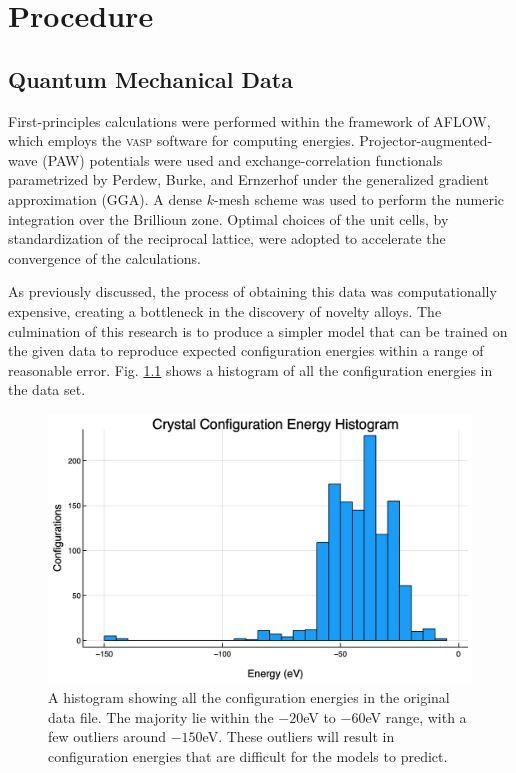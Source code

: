\chapter{Procedure} \label{Sect:procedure}
\section{Quantum Mechanical Data}\label{Sect:procedureData}
\par First-principles calculations were performed within the framework of AFLOW,\cite{monster,curtarolo:art13,curtarolo:art49,curtarolo:art53,curtarolo:art51,curtarolo:art56,curtarolo:art58,curtarolo:art64} which employs the \textsc{vasp} software for computing energies.\cite{kresse1993abinitio} Projector-augmented-wave (PAW) potentials were used and exchange-correlation functionals parametrized by Perdew, Burke, and Ernzerhof under the generalized gradient approximation (GGA)\cite{Kresse:1999wc,kresse1996efficiency,Blochl:1994dx}. A dense $k$-mesh scheme was used to perform the numeric integration over the Brillioun zone\cite{monkhorst1976special}. Optimal choices of the unit cells, by standardization of the reciprocal lattice, were adopted to accelerate the convergence of the calculations. \cite{curtarolo:art58,curtarolo:art64}
\par As previously discussed, the process of obtaining this data was computationally expensive, creating a bottleneck in the discovery of novelty alloys. The culmination of this research is to produce a simpler model that can be trained on the given data to reproduce expected configuration energies within a range of reasonable error. Fig. \ref{histEnergy} shows a histogram of all the configuration energies in the data set.

\begin{figure}%
\centering
\includegraphics[scale = 0.45]{Figures/UnitCellEnergies}
\caption{A histogram showing all the configuration energies in the original data file. The majority lie within the $-20$eV to $-60$eV range, with a few outliers around $-150$eV. These outliers will result in configuration energies that are difficult for the models to predict.
\label{histEnergy}} 
\end{figure}

